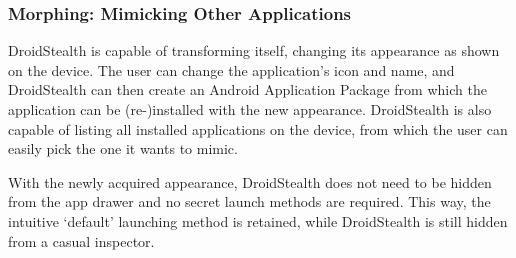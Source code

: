 \subsubsection{Morphing: Mimicking Other Applications}
DroidStealth is capable of transforming itself, changing its appearance as shown on the device.
The user can change the application's icon and name, and DroidStealth can then create an Android Application Package from which the application can be (re-)installed with the new appearance.
DroidStealth is also capable of listing all installed applications on the device, from which the user can easily pick the one it wants to mimic.

With the newly acquired appearance, DroidStealth does not need to be hidden from the app drawer and no secret launch methods are required.
This way, the intuitive `default' launching method is retained, while DroidStealth is still hidden from a casual inspector.
